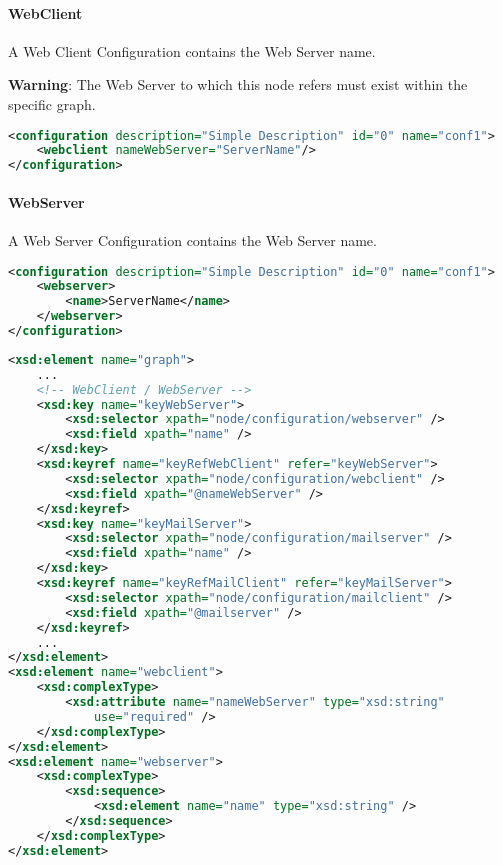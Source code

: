 \paragraph{WebClient}

A Web Client Configuration contains the Web Server name.

\begin{warning}
\textbf{Warning}: The Web Server to which this node refers must exist within the specific graph.
\end{warning}

\begin{lstlisting}[language=XML, caption=WebClient Configuration Example]
<configuration description="Simple Description" id="0" name="conf1">
    <webclient nameWebServer="ServerName"/>
</configuration>
\end{lstlisting}

\paragraph{WebServer}

A Web Server Configuration contains the Web Server name.

\begin{lstlisting}[language=XML, caption=WebServer Configuration Example]
<configuration description="Simple Description" id="0" name="conf1">
    <webserver>
    	<name>ServerName</name>
    </webserver>
</configuration>
\end{lstlisting}
\begin{lstlisting}[language=XML, caption=WebClient and WebServer schema code snippet]
<xsd:element name="graph">
    ...
    <!-- WebClient / WebServer -->
    <xsd:key name="keyWebServer">
        <xsd:selector xpath="node/configuration/webserver" />
        <xsd:field xpath="name" />
    </xsd:key>
    <xsd:keyref name="keyRefWebClient" refer="keyWebServer">
        <xsd:selector xpath="node/configuration/webclient" />
        <xsd:field xpath="@nameWebServer" />
    </xsd:keyref>
    <xsd:key name="keyMailServer">
        <xsd:selector xpath="node/configuration/mailserver" />
        <xsd:field xpath="name" />
    </xsd:key>
    <xsd:keyref name="keyRefMailClient" refer="keyMailServer">
        <xsd:selector xpath="node/configuration/mailclient" />
        <xsd:field xpath="@mailserver" />
    </xsd:keyref>
    ...
</xsd:element>
<xsd:element name="webclient">
    <xsd:complexType>
        <xsd:attribute name="nameWebServer" type="xsd:string"
            use="required" />
    </xsd:complexType>
</xsd:element>
<xsd:element name="webserver">
    <xsd:complexType>
        <xsd:sequence>
            <xsd:element name="name" type="xsd:string" />
        </xsd:sequence>
    </xsd:complexType>
</xsd:element>
\end{lstlisting}

